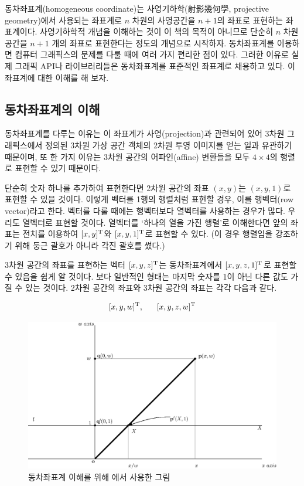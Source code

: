 동차좌표계(homogeneous coordinate)는 사영기하학(射影幾何學, projective geometry)에서 사용되는 좌표계로
$n$ 차원의 사영공간을 $n+1$의 좌표로 표현하는 좌표계이다.
사영기하학적 개념을 이해하는 것이 이 책의 목적이 아니므로 단순히 $n$ 차원 공간을 $n+1$ 개의 좌표로 표현한다는 정도의 개념으로 시작하자.
동차좌표계를 이용하면 컴퓨터 그래픽스의 문제를 다룰 때에 여러 가지 편리한 점이 있다. 그러한 이유로 실제 그래픽 API나 라이브러리들은
동차좌표계를 표준적인 좌표계로 채용하고 있다. 이 좌표계에 대한 이해를 해 보자.

\subsection{동차좌표계의 이해}
동차좌표계를 다루는 이유는 이 좌표계가 사영(projection)과 관련되어 있어 3차원 그래픽스에서 정의된 3차원 가상 공간 객체의 2차원 투영 이미지를 얻는 일과
유관하기 때문이며, 또 한 가지 이유는 3차원 공간의 어파인(affine) 변환들을 모두 $4 \times 4$의 행렬로 표현할 수 있기 때문이다.

단순히 숫자 하나를 추가하여 표현한다면 2차원 공간의 좌표 $(x,y)$는 $(x,y,1)$로 표현할 수 있을 것이다. 이렇게 벡터를 1행의 행렬처럼 표현할 경우,
이를 행벡터(row vector)라고 한다. 벡터를 다룰 때에는 행벡터보다 열벡터를 사용하는 경우가 많다. 우리도 열벡터로 표현할 것이다.
열벡터를 `하나의 열을 가진 행렬'로 이해한다면 앞의 좌표는 전치를 이용하여 $[x,y]^{\rm T}$와 $[x, y, 1]^{\rm T}$로 표현할 수 있다. (이 경우 행렬임을 강조하기 위해 둥근 괄호가 아니라 각진 괄호를 썼다.)

3차원 공간의 좌표를 표현하는 벡터 $[x,y,z]^{\rm T}$는 동차좌표계에서 $[x,y,z,1]^{\rm T}$로 표현할 수 있음을 쉽게 알 것이다.
보다 일반적인 형태는 마지막 숫자를 1이 아닌 다른 값도 가질 수 있는 것이다. 2차원 공간의 좌표와 3차원 공간의 좌표는 각각 다음과 같다.

$$[x,y,w]^{\rm T}, ~~~~~[x,y,z,w]^{\rm T}$$

\begin{figure}[h!]
  \centering
    \includegraphics[width=12cm]{Math_transform/homogeneousConcept.eps}
    \caption{동차좌표계 이해를 위해 \cite{Ammeraal1986}에서 사용한 그림}
    \label{fig:transform:transformConcept}
\end{figure}

